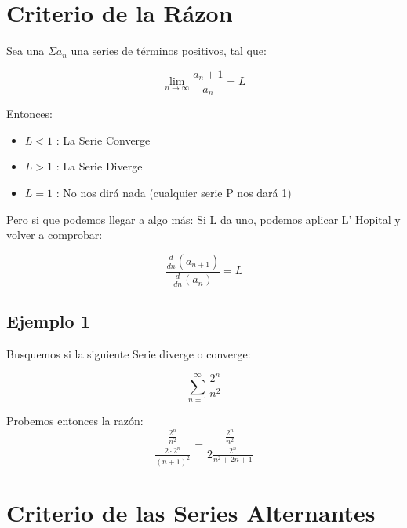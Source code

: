 \documentclass[12pt]{report}							    %
\begin{document}
    \section{Criterio de la Rázon}

    Sea una $\Sigma a_n$ una series de términos positivos, tal que:

    \begin{equation}
        \lim_{n \to \infty} \frac{a_n+1}{a_n} = L
    \end{equation}

    Entonces:
    \begin{itemize}
        \item $L < 1$ : La Serie Converge
        \item $L > 1$ : La Serie Diverge
        \item $L = 1$ : No nos dirá nada (cualquier serie P nos dará 1)
    \end{itemize}

    Pero si que podemos llegar a algo más:
    Si L da uno, podemos aplicar L' Hopital y volver a comprobar:

    \begin{equation}
    \frac{\frac{d}{dn} (a_{n+1})}{\frac{d}{dn} (a_n)} = L
    \end{equation}



    \subsection{Ejemplo 1}
    Busquemos si la siguiente Serie diverge o converge:

    \begin{equation*}
        \sum_{n=1}^{\infty} \frac{2^n}{n^2}
    \end{equation*}

    Probemos entonces la razón:
    \begin{equation*}
        \frac{ \frac{2^n}{n^2} }{ \frac{2 \cdot 2^n}{(n+1)^2 } } = \frac{ \frac{2^n}{n^2} }{ 2 \frac{2^n}{n^2 + 2n + 1} }
    \end{equation*}



    \clearpage
    \section{Criterio de las Series Alternantes}
\end{document}
